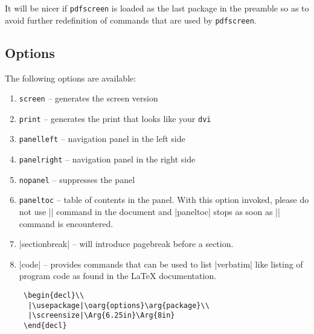 \documentclass[a4paper]{article}
\def\pdfscreen{\texttt{\small\color{section1}pdfscreen}\xspace}
\begin{document}
It will be nicer if \pdfscreen is loaded as the last package
in the preamble so as to avoid further redefinition of commands that
are used by \pdfscreen.


\subsection{Options}\label{options}
The following options are available:

\begin{enumerate}

\item \verb+screen+ -- generates the screen version

\item \verb+print+  -- generates the print that looks like your
\verb+dvi+

\item \verb+panelleft+ -- navigation panel in the left
side

\item \verb+panelright+ -- navigation panel in the right
side

\item \verb+nopanel+ -- suppresses the panel

\item \verb+paneltoc+ -- table of contents in the panel. With this
option invoked, please do not use |\tableofcontents| command in the
document and |paneltoc| stops as soon as |\tableofcontents| command is
encountered.

\item |sectionbreak| -- will introduce pagebreak before a section.

\item |code| -- provides commands that can be used to list |verbatim|
like listing of program code as found in the \LaTeX{} documentation.

\begin{verbatim}
 \begin{decl}\\
  |\usepackage|\oarg{options}\arg{package}\\
  |\screensize|\Arg{6.25in}\Arg{8in}
 \end{decl}
\end{verbatim}



\end{enumerate}
\end{document}
